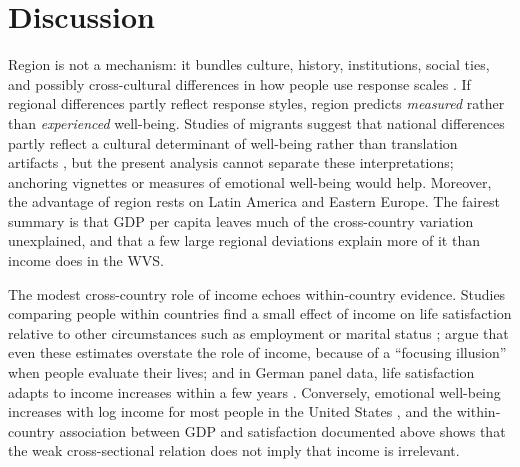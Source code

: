 \documentclass[12pt]{article}
\begin{document}
\section{Discussion}\label{sec:discussion}
Region is not a mechanism: it bundles culture, history, institutions, social ties, and possibly cross-cultural differences in how people use response scales \citep{chen_response_1995,diener_personality_2003,exton_comparing_2015}. If regional differences partly reflect response styles, region predicts \textit{measured} rather than \textit{experienced} well-being. Studies of migrants suggest that national differences partly reflect a cultural determinant of well-being rather than translation artifacts \citep{senik_french_2014,exton_comparing_2015}, but the present analysis cannot separate these interpretations; anchoring vignettes \citep{kapteyn_life_2010} or measures of emotional well-being would help. Moreover, the advantage of region rests on Latin America and Eastern Europe. The fairest summary is that GDP per capita leaves much of the cross-country variation unexplained, and that a few large regional deviations explain more of it than income does in the WVS.

The modest cross-country role of income echoes within-country evidence. Studies comparing people within countries find a small effect of income on life satisfaction relative to other circumstances such as employment or marital status \citep{helliwell_hows_2003,blanchflower_well-being_2004}; \citet{kahneman_would_2006} argue that even these estimates overstate the role of income, because of a ``focusing illusion'' when people evaluate their lives; and in German panel data, life satisfaction adapts to income increases within a few years \citep{di_tella_happiness_2010}. Conversely, emotional well-being increases with log income for most people in the United States \citep{killingsworth_income_2023}, and the within-country association between GDP and satisfaction documented above shows that the weak cross-sectional relation does not imply that income is irrelevant.
\end{document}

